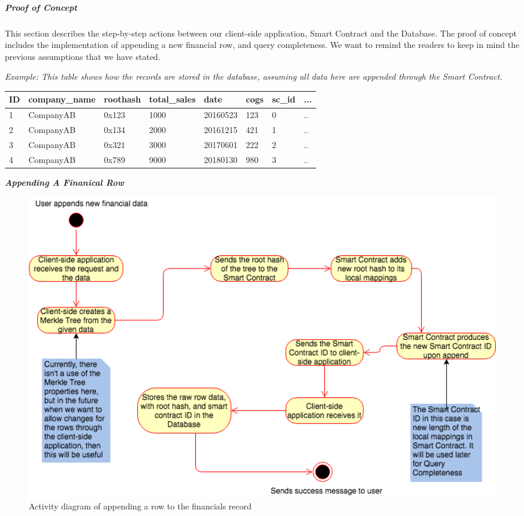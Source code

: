 \subparagraph{Proof of Concept}

This section describes the step-by-step actions between our client-side application, Smart Contract and the Database. The proof of concept includes the implementation of appending a new financial row, and query completeness. We want to remind the readers to keep in mind the previous assumptions that we have stated. 


\textit{Example: This table shows how the records are stored in the database, assuming all data here are appended through the Smart Contract.}
\begin{center}
    \begin{tabular}{| l | l | l | l | l | l | l | l |}
    \hline
    ID & company\_name & roothash & total\_sales & date & cogs & sc\_id & ... \\ \hline
    1 & CompanyAB & 0x123 & 1000 & 20160523 & 123 & 0 & .. \\ \hline
    2 & CompanyAB & 0x134 & 2000 & 20161215 & 421 & 1 & .. \\ \hline
    3 & CompanyAB & 0x321 & 3000 & 20170601 & 222 & 2 & .. \\ \hline
    4 & CompanyAB & 0x789 & 9000 & 20180130 & 980 & 3 & .. \\ \hline
    \end{tabular}
\end{center}



\textbf{\textit{Appending A Finanical Row}}

\begin{figure}[h]%
\centering
\includegraphics[width=1.0\textwidth]{images/appendRowFinancials.png}
\caption{\label{fig:appendRowFinancials}Activity diagram of appending a row to the financials record}
\end{figure}

